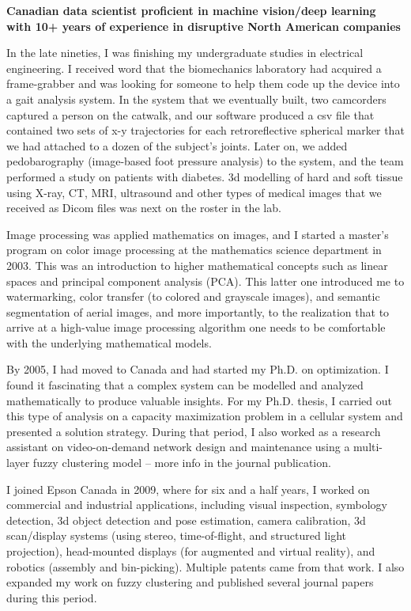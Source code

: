 \onehalfspace
\textbf{\large Canadian data scientist proficient in machine vision/deep learning with 10+ years of experience in disruptive North American companies}
\singlespace

\vspace{0.8cm}

In the late nineties, I was finishing my undergraduate studies in electrical engineering. I received word that the biomechanics laboratory had acquired a frame-grabber and was looking for someone to help them code up the device into a gait analysis system. In the system that we eventually built, two camcorders captured a person on the catwalk, and our software produced a csv file that contained two sets of x-y trajectories for each retroreflective spherical marker that we had attached to a dozen of the subject’s joints. Later on, we added pedobarography (image-based foot pressure analysis) to the system, and the team performed a study on patients with diabetes. 3d modelling of hard and soft tissue using X-ray, CT, MRI, ultrasound and other types of medical images that we received as Dicom files was next on the roster in the lab.

\newcommand{\osspacing}{\vspace{0.5cm}}

\osspacing
Image processing was applied mathematics on images, and I started a master’s program on color image processing at the mathematics science department in 2003. This was an introduction to higher mathematical concepts such as linear spaces and principal component analysis (PCA). This latter one introduced me to watermarking, color transfer (to colored and grayscale images), and semantic segmentation of aerial images, and more importantly, to the realization that to arrive at a high-value image processing algorithm one needs to be comfortable with the underlying mathematical models.

\osspacing
By 2005, I had moved to Canada and had started my Ph.D. on optimization. I found it fascinating that a complex system can be modelled and analyzed mathematically to produce valuable insights. For my Ph.D. thesis, I carried out this type of analysis on a capacity maximization problem in a cellular system and presented a solution strategy. During that period, I also worked as a research assistant on video-on-demand network design and maintenance using a multi-layer fuzzy clustering model – more info in the journal publication.	

\osspacing
I joined Epson Canada in 2009, where for six and a half years, I worked on commercial and industrial applications, including visual inspection, symbology detection, 3d object detection and pose estimation, camera calibration, 3d scan/display systems (using stereo, time-of-flight, and structured light projection), head-mounted displays (for augmented and virtual reality), and robotics (assembly and bin-picking). Multiple patents came from that work. I also expanded my work on fuzzy clustering and published several journal papers during this period.			

